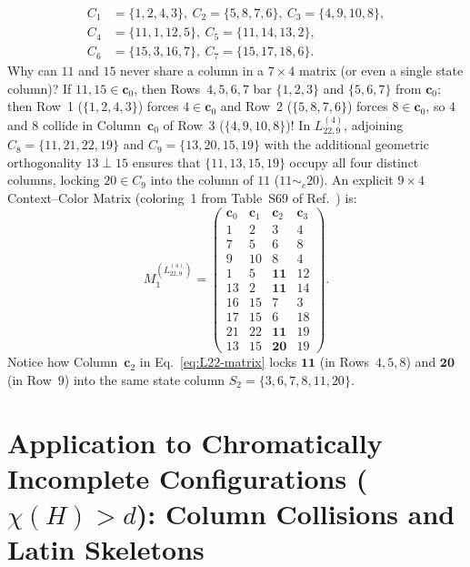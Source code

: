 \documentclass[aps,pra,reprint,superscriptaddress,longbibliography,nofootinbib,floatfix,10pt]{revtex4-2}
\theoremstyle{definition}\newtheorem{definition}[theorem]{Definition}
\theoremstyle{remark}\newtheorem{remark}[theorem]{Remark}
\begin{document}
\begin{itemize}
\[
\begin{aligned}
C_1&=\{1,2,4,3\},\ C_2=\{5,8,7,6\},\ C_3=\{4,9,10,8\},\\
C_4&=\{11,1,12,5\},\ C_5=\{11,14,13,2\},\\
C_6&=\{15,3,16,7\},\ C_7=\{15,17,18,6\}.
\end{aligned}
\]
Why can $11$ and $15$ never share a column in a $7\times 4$ matrix (or even a single state column)? If $11,15\in\mathbf{c}_0$, then Rows~$4,5,6,7$ bar $\{1,2,3\}$ and $\{5,6,7\}$ from $\mathbf{c}_0$; then Row~1 ($\{1,2,4,3\}$) forces $4\in\mathbf{c}_0$ and Row~2 ($\{5,8,7,6\}$) forces $8\in\mathbf{c}_0$, so $4$ and $8$ collide in Column~$\mathbf{c}_0$ of Row~3 ($\{4,9,10,8\}$)! In $L_{22,9}^{(4)}$, adjoining $C_8=\{11,21,22,19\}$ and $C_9=\{13,20,15,19\}$ with the additional geometric orthogonality $13\perp 15$ ensures that $\{11,13,15,19\}$ occupy all four distinct columns, locking $20\in C_9$ into the column of $11$ ($11\sim_c 20$). An explicit $9\times 4$ Context--Color Matrix (coloring~1 from Table~S69 of Ref.~\cite{supplement}) is:
\begin{equation}\label{eq:L22-matrix}
M_1^{(L_{22,9}^{(4)})}=\begin{pmatrix}
\mathbf{c}_0 & \mathbf{c}_1 & \mathbf{c}_2 & \mathbf{c}_3\\\hline
1 & 2 & 3 & 4\\
7 & 5 & 6 & 8\\
9 & 10 & 8 & 4\\
1 & 5 & \mathbf{11} & 12\\
13 & 2 & \mathbf{11} & 14\\
16 & 15 & 7 & 3\\
17 & 15 & 6 & 18\\
21 & 22 & \mathbf{11} & 19\\
13 & 15 & \mathbf{20} & 19
\end{pmatrix}.
\end{equation}
Notice how Column~$\mathbf{c}_2$ in Eq.~\eqref{eq:L22-matrix} locks $\mathbf{11}$ (in Rows~$4,5,8$) and $\mathbf{20}$ (in Row~$9$) into the same state column $S_2=\{3,6,7,8,11,20\}$.
\end{itemize}

\section{Application to Chromatically Incomplete Configurations (\texorpdfstring{$\chi(H)>d$}{chi(H)>d}): Column Collisions and Latin Skeletons}\label{sec:obstructions}
\end{document}
